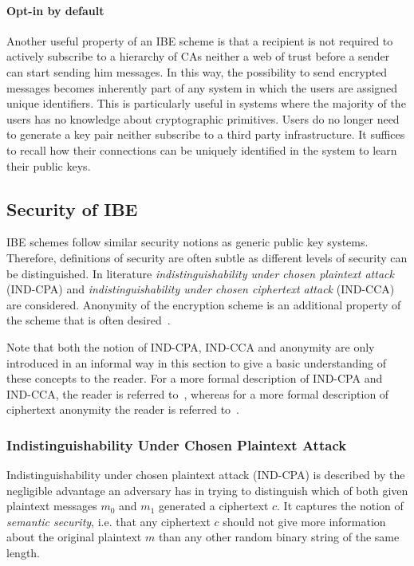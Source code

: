 \paragraph{Opt-in by default}
Another useful property of an IBE scheme is that a recipient is not required to actively subscribe to a hierarchy of CAs neither a web of trust before a sender can start sending him messages. In this way, the possibility to send encrypted messages becomes inherently part of any system in which the users are assigned unique identifiers. This is particularly useful in systems where the majority of the users has no knowledge about cryptographic primitives. Users do no longer need to generate a key pair neither subscribe to a third party infrastructure. It suffices to recall how their connections can be uniquely identified in the system to learn their public keys.

\subsection{Security of IBE}
IBE schemes follow similar security notions as generic public key systems. Therefore, definitions of security are often subtle as different levels of security can be distinguished. In literature \textit{indistinguishability under chosen plaintext attack} (IND-CPA) and \textit{indistinguishability under chosen ciphertext attack} (IND-CCA) are considered. Anonymity of the encryption scheme is an additional property of the scheme that is often desired~\cite{art:BellareBDP01}.

Note that both the notion of IND-CPA, IND-CCA and anonymity are only introduced in an informal way in this section to give a basic understanding of these concepts to the reader. For a more formal description of IND-CPA and IND-CCA, the reader is referred to~\cite{art:BonehF01}, whereas for a more formal description of ciphertext anonymity the reader is referred to~\cite{art:AbdallaBCKKLMNPS05}.

\subsubsection{Indistinguishability Under Chosen Plaintext Attack}
Indistinguishability under chosen plaintext attack (IND-CPA) is described by the negligible advantage an adversary has in trying to distinguish which of both given plaintext messages $m_0$ and $m_1$ generated a ciphertext $c$. It captures the notion of \textit{semantic security}, i.e. that any ciphertext $c$ should not give more information about the original plaintext $m$ than any other random binary string of the same length.

